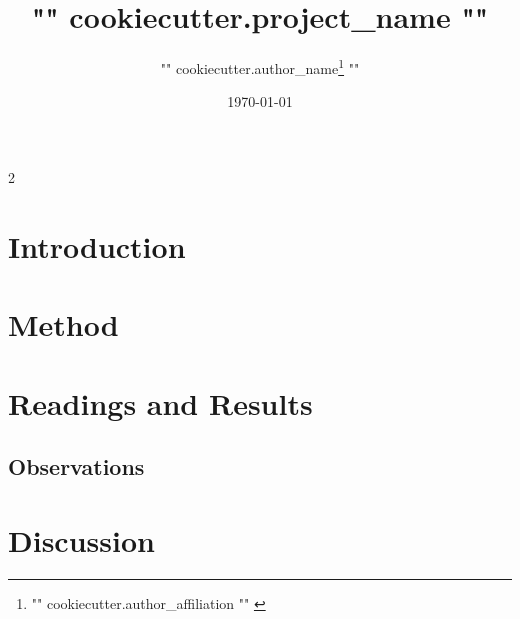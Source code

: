 \documentclass[11pt,a4paper]{{ "{" }}{{cookiecutter.document_class}}{{ "}" }}
\title{{ "{" }}{{cookiecutter.project_name}}{{ "}" }}
\author{{ "{" }}{{cookiecutter.author_name}}\thanks{{ "{" }}{{cookiecutter.author_affiliation}}{{ "}" }}{{ "}"}}
\date{\today}
\numberwithin{equation}{section}
\begin{document}
\pagestyle{empty}

\maketitle

\pagestyle{fancy}

\begin{multicols}{2}

\begin{abstract}
    \lipsum[1] 
\end{abstract}

\section{Introduction}

\lipsum[0-3]


\section{Method}

\lipsum[4-7]

\section{Readings and Results}
\subsection{Observations}

\section{Discussion}


\end{multicols}
\end{document}
